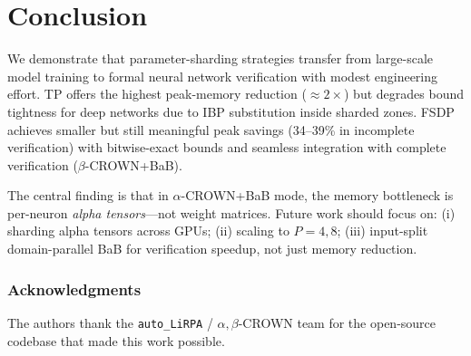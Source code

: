 \documentclass[11pt]{article}
\begin{document}
\section{Conclusion}
\label{sec:conclusion}

We demonstrate that parameter-sharding strategies transfer from large-scale
model training to formal neural network verification with modest engineering
effort. TP offers the highest peak-memory reduction (${\approx}2\times$) but
degrades bound tightness for deep networks due to IBP substitution inside
sharded zones. FSDP achieves smaller but still meaningful peak savings
(34--39\% in incomplete verification) with bitwise-exact bounds and seamless
integration with complete verification ($\beta$-CROWN+BaB).

The central finding is that in $\alpha$-CROWN+BaB mode, the memory bottleneck
is per-neuron \emph{alpha tensors}---not weight matrices. Future work should
focus on: (i) sharding alpha tensors across GPUs; (ii) scaling to $P{=}4, 8$;
(iii) input-split domain-parallel BaB for verification speedup, not just memory
reduction.

\subsubsection*{Acknowledgments}
The authors thank the \texttt{auto\_LiRPA} / $\alpha,\beta$-CROWN team for the
open-source codebase that made this work possible.



\end{document}
